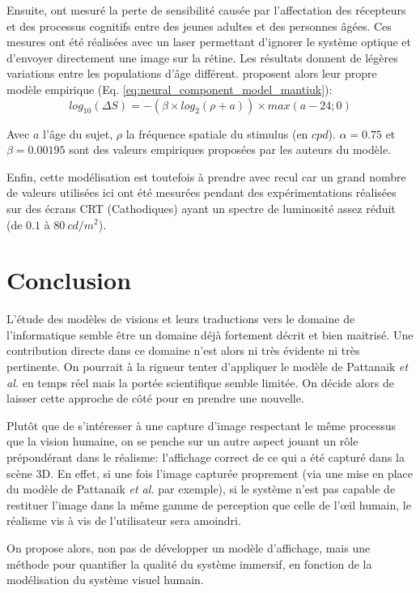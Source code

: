 	\par Ensuite, \citep{burton_aging_1993} ont mesuré la perte de sensibilité causée par l'affectation des récepteurs et des processus cognitifs entre des jeunes adultes et des personnes âgées. Ces mesures ont été réalisées avec un laser permettant d'ignorer le système optique et d'envoyer directement une image sur la rétine. Les résultats donnent de légères variations entre les populations d'âge différent. \citep{mantiuk_human_2015} proposent alors leur propre modèle empirique (Eq. \ref{eq:neural_component_model_mantiuk}):
	\begin{equation}
		log_{10}(\Delta S) = - (\beta \times log_2(\rho + a)) \times max(a-24;0)
		\label{eq:neural_component_model_mantiuk}
	\end{equation}
	
	\par Avec $a$ l'âge du sujet, $\rho$ la fréquence spatiale du stimulus (en $cpd$). $\alpha = 0.75$ et $\beta = 0.00195$ sont des valeurs empiriques proposées par les auteurs du modèle.
	
	\par Enfin, cette modélisation est toutefois à prendre avec recul car un grand nombre de valeurs utilisées ici ont été mesurées pendant des expérimentations réalisées sur des écrans CRT (Cathodiques) ayant un spectre de luminosité assez réduit (de $0.1$ à $80~cd/m^2$).
	
	\chapter*{Conclusion}
	\par L'étude des modèles de visions et leurs traductions vers le domaine de l'informatique semble être un domaine déjà fortement décrit et bien maitrisé. Une contribution directe dans ce domaine n'est alors ni très évidente ni très pertinente. On pourrait à la rigueur tenter d'appliquer le modèle de Pattanaik \textit{et al.} en temps réel mais la portée scientifique semble limitée. On décide alors de laisser cette approche de côté pour en prendre une nouvelle.
	
	\par Plutôt que de s'intéresser à une capture d'image respectant le même processus que la vision humaine, on se penche sur un autre aspect jouant un rôle prépondérant dans le réalisme: l'affichage correct de ce qui a été capturé dans la scène 3D. En effet, si une fois l'image capturée proprement (via une mise en place du modèle de Pattanaik \textit{et al.} par exemple), si le système n'est pas capable de restituer l'image dans la même gamme de perception que celle de l'œil humain, le réalisme vis à vis de l'utilisateur sera amoindri.
	
	\par On propose alors, non pas de développer un modèle d'affichage, mais une méthode pour quantifier la qualité du système immersif, en fonction de la modélisation du système visuel humain.